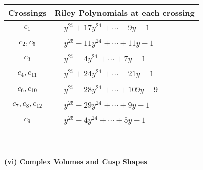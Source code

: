 \documentclass[1p]{elsarticle_modified}
\theoremstyle{definition}
\begin{document}
\begin{tabular}{m{50pt}|m{274pt}}
Crossings & \hspace{64pt}Riley Polynomials at each crossing \\
\hline $$\begin{aligned}c_{1}\end{aligned}$$&$\begin{aligned}
&y^{25}+17 y^{24}+\cdots-9 y-1
\end{aligned}$\\
\hline $$\begin{aligned}c_{2},c_{5}\end{aligned}$$&$\begin{aligned}
&y^{25}-11 y^{24}+\cdots+11 y-1
\end{aligned}$\\
\hline $$\begin{aligned}c_{3}\end{aligned}$$&$\begin{aligned}
&y^{25}-4 y^{24}+\cdots+7 y-1
\end{aligned}$\\
\hline $$\begin{aligned}c_{4},c_{11}\end{aligned}$$&$\begin{aligned}
&y^{25}+24 y^{24}+\cdots-21 y-1
\end{aligned}$\\
\hline $$\begin{aligned}c_{6},c_{10}\end{aligned}$$&$\begin{aligned}
&y^{25}-28 y^{24}+\cdots+109 y-9
\end{aligned}$\\
\hline $$\begin{aligned}c_{7},c_{8},c_{12}\end{aligned}$$&$\begin{aligned}
&y^{25}-29 y^{24}+\cdots+9 y-1
\end{aligned}$\\
\hline $$\begin{aligned}c_{9}\end{aligned}$$&$\begin{aligned}
&y^{25}-4 y^{24}+\cdots+5 y-1
\end{aligned}$\\
\hline
\end{tabular}\\~\\
\newpage\flushleft \textbf{(vi) Complex Volumes and Cusp Shapes}
\end{document}
